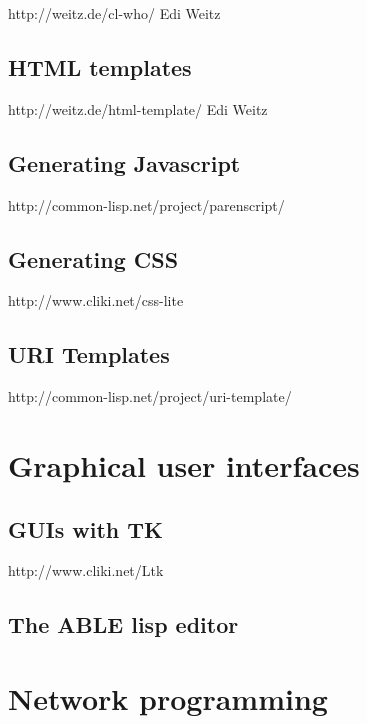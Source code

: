 \documentclass[10pt,english]{book}
\begin{document}
http://weitz.de/cl-who/
Edi Weitz

\section{HTML templates}
\label{sec:html-templates}

http://weitz.de/html-template/
Edi Weitz

\section{Generating Javascript}
\label{sec:gener-javascr}

http://common-lisp.net/project/parenscript/

\section{Generating CSS}
\label{sec:generating-css}

http://www.cliki.net/css-lite

\section{URI Templates}
\label{sec:uri-templates}

http://common-lisp.net/project/uri-template/



\chapter{Graphical user interfaces}
\label{cha:graph-user-interf}

\section{GUIs with TK}
\label{sec:guis-with-tk}

http://www.cliki.net/Ltk

\section{The ABLE lisp editor}
\label{sec:able-lisp-editor}



\chapter{Network programming}
\label{cha:network-programming}
\end{document}
